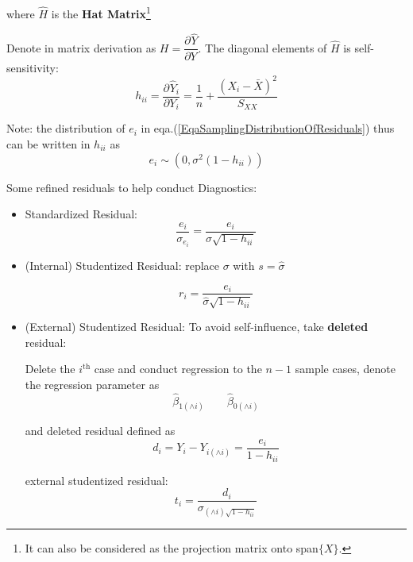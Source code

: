     where $ \hat{H} $ is the \textbf{Hat Matrix}\footnote{It can also be considered as the projection matrix onto span$ \{X\} $.} 

    Denote in matrix derivation as $ H=\dfrac{\partial^{} \hat{Y}}{\partial Y^{}} $. The diagonal elements of $ \hat{H} $ is self-sensitivity:
    \begin{equation}
    h_{ii}=\dfrac{\partial^{} \hat{Y}_i}{\partial Y_i^{}} =\dfrac{1}{n}+\dfrac{(X_i-\bar{X})^2}{S_{XX}}
    \end{equation}

    Note: the distribution of $ e_i $ in eqa.(\ref{EqaSamplingDistributionOfResiduals}) thus can be written in $ h_{ii} $ as 
    \begin{equation}
        e_i\sim (0,\sigma ^2(1-h_{ii})) 
    \end{equation}

    Some refined residuals to help conduct Diagnostics:
\begin{itemize}[topsep=2pt,itemsep=2pt]
    \item Standardized Residual:
    \begin{equation}
         \dfrac{e_i}{\sigma _{e_i}}=\dfrac{e_i}{\sigma \sqrt{1-h_{ii}}}
    \end{equation}
    \item (Internal) Studentized Residual: replace $ \sigma  $ with $ s=\hat{\sigma } $
    
    \begin{equation}
         r_i=\dfrac{e_i}{\hat{\sigma }\sqrt{1-h_{ii}}}
    \end{equation}
    \item (External) Studentized Residual: To avoid self-influence, take \textbf{deleted} residual:
    
    Delete the $ i^{\mathrm{th}} $ case and conduct regression to the $ n-1 $ sample cases, denote the regression parameter as 
    \begin{equation}
        \hat{\beta }_{1(\wedge i)}\qquad \hat{\beta }_{0(\wedge i)} 
    \end{equation}
    
    and deleted residual defined as 
    \begin{equation}
        d_i=Y_i-Y_{i(\wedge i)} =\dfrac{e_i}{1-h_{ii}}
    \end{equation}

    external studentized residual:
    \begin{equation}
         t_i=\dfrac{d_i}{\sigma _{(\wedge i)\sqrt{1-h_{ii}}}}
    \end{equation}
    
    
\end{itemize}


